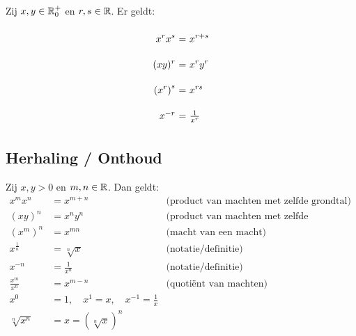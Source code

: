 \documentclass{ximera}
\begin{document}
\begin{proposition}
	Zij $x,y\in\mathbb{R}_0^+$ en $r,s\in\mathbb{R}$. Er geldt:
	\[
	\arraycolsep=1.4pt\def\arraystretch{2.2}
	\begin{array}{r@{\ =\ }l}
	\ds{x^{r}x^{s}}&\ds{x^{r+s}}\\
	\ds{(xy)^r}&\ds{x^ry^r}\\
	\ds{\left(x^{r}\right)^{s}}&\ds{x^{rs}}\\
	x^{-r} & \frac{1}{x^r} \\
	\end{array}
	\]
\end{proposition}



\subsection{Herhaling / Onthoud }\label{machtenrekenregels}

\begin{proposition}
Zij $x,y>0$ en $m,n\in\mathbb R$. Dan geldt:
\begin{align*}
	x^{m}x^{n}          &= x^{m+n}     & \text{(product van machten met zelfde grondtal)}\\
	(xy)^n              &= x^ny^n      & \text{(product van machten met zelfde exponent)}\\
	\left(x^{m}\right)^{n}&= x^{mn}    & \text{(macht van een macht)}\\	
	x^{\frac1n} &= \sqrt[n] x          & \text{(notatie/definitie)}\\
	x^{-n}          &= \frac{1}{x^n}  & \text{(notatie/definitie)}\\
	\frac{x^{m}}{x^{n}} &= x^{m-n}      & \text{(quotiënt van machten)} \\
	x^0&=1, \quad x^1=x, \quad x^{-1}=\frac1x \\
	\sqrt[n]{x^n} & = x = (\sqrt[n]{x})^n
\end{align*}
\end{proposition}
\end{document}
